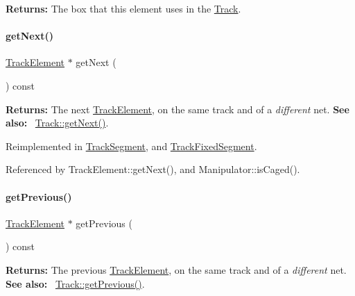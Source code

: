 {\bfseries Returns\+:} The box that this element uses in the \hyperlink{classKite_1_1Track}{Track}. \mbox{\label{classKite_1_1TrackElement_a010b7fc8801c5b88aefa4137cf85186d}} 
\paragraph{\texorpdfstring{get\+Next()}{getNext()}}
{\footnotesize\ttfamily \hyperlink{classKite_1_1TrackElement}{Track\+Element} $\ast$ get\+Next (\begin{DoxyParamCaption}{ }\end{DoxyParamCaption}) const\hspace{0.3cm}{\ttfamily [virtual]}}

{\bfseries Returns\+:} The next \hyperlink{classKite_1_1TrackElement}{Track\+Element}, on the same track and of a {\itshape different} net. {\bfseries See also\+:}~ \hyperlink{classKite_1_1Track_af3db59591bef3c690ace92c114a4e4aa}{Track\+::get\+Next()}. 

Reimplemented in \hyperlink{classKite_1_1TrackSegment_a010b7fc8801c5b88aefa4137cf85186d}{Track\+Segment}, and \hyperlink{classKite_1_1TrackFixedSegment_a010b7fc8801c5b88aefa4137cf85186d}{Track\+Fixed\+Segment}.



Referenced by Track\+Element\+::get\+Next(), and Manipulator\+::is\+Caged().

\mbox{\label{classKite_1_1TrackElement_a55d6115d84c11ad147f4c38fe372ea24}} 
\paragraph{\texorpdfstring{get\+Previous()}{getPrevious()}}
{\footnotesize\ttfamily \hyperlink{classKite_1_1TrackElement}{Track\+Element} $\ast$ get\+Previous (\begin{DoxyParamCaption}{ }\end{DoxyParamCaption}) const\hspace{0.3cm}{\ttfamily [virtual]}}

{\bfseries Returns\+:} The previous \hyperlink{classKite_1_1TrackElement}{Track\+Element}, on the same track and of a {\itshape different} net. {\bfseries See also\+:}~ \hyperlink{classKite_1_1Track_a290fcfe6131730d216951a3b5207d777}{Track\+::get\+Previous()}. 

